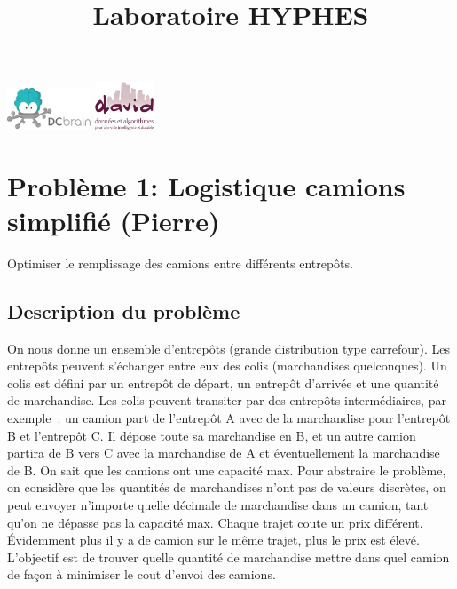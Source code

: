\documentclass{article}
\begin{document}
\title{Laboratoire HYPHES}


\maketitle
  
\begin{center}
  \includegraphics [width=25mm]{logodcbrain.png} \hspace{1cm} \includegraphics [width=17.5mm]{logod.png}
\end{center}


\section{Problème 1: Logistique camions simplifié (Pierre)}
  Optimiser le remplissage des camions entre différents entrepôts.

\subsection{Description du problème}
On nous donne un ensemble d'entrepôts (grande distribution type carrefour). Les entrepôts peuvent s'échanger entre eux des colis (marchandises quelconques). Un colis est défini par un entrepôt de départ, un entrepôt d'arrivée et une quantité de marchandise. Les colis peuvent transiter par des entrepôts intermédiaires, par exemple : un camion part de l'entrepôt A avec de la marchandise pour l'entrepôt B et l'entrepôt C. Il dépose toute sa marchandise en B, et un autre camion partira de B vers C avec la marchandise de A et éventuellement la marchandise de B.
On sait que les camions ont une capacité max. Pour abstraire le problème, on considère que les quantités de marchandises n'ont pas de valeurs discrètes, on peut envoyer n'importe quelle décimale de marchandise dans un camion, tant qu'on ne dépasse pas la capacité max. Chaque trajet coute un prix différent. Évidemment plus il y a de camion sur le même trajet, plus le prix est élevé. L'objectif est de trouver quelle quantité de marchandise mettre dans quel camion de façon à minimiser le cout d'envoi des camions.
\end{document}

